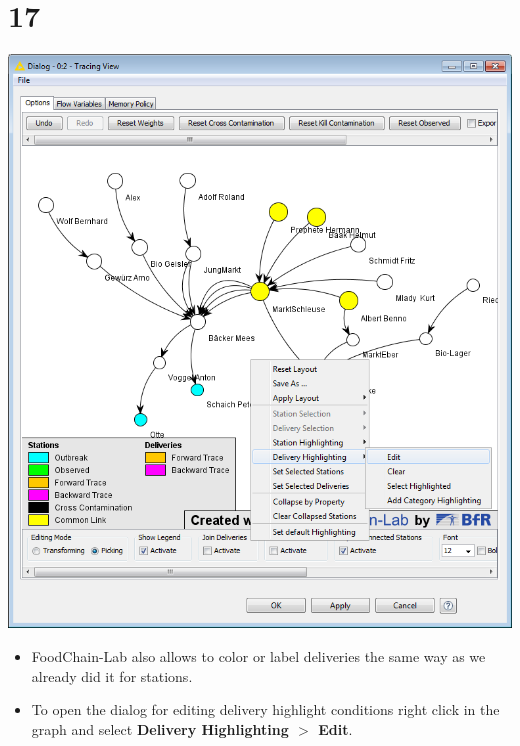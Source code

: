\documentclass{beamer}
\begin{document}
\section{17}
\begin{frame}
	\begin{center}
  		\includegraphics[height=0.6\textheight]{17.png}
	\end{center}
	\begin{itemize}
		\item FoodChain-Lab also allows to color or label deliveries the same way as we already did it for stations.
		\item To open the dialog for editing delivery highlight conditions right click in the graph and select \textbf{Delivery Highlighting $>$ Edit}.
	\end{itemize}
\end{frame}
\end{document}
